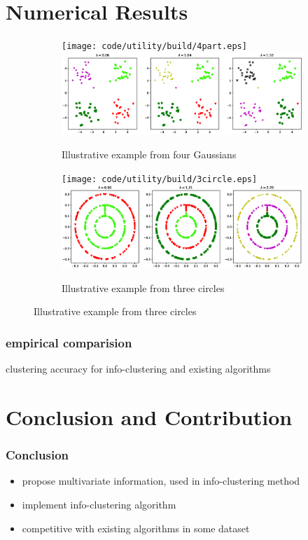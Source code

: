 \documentclass{beamer}
\begin{document}
\section{Numerical Results}
\begin{frame}
\begin{figure}[!ht]
\centering
\begin{subfigure}{\textwidth}
{\texttt{[image: code/utility/build/4part.eps]}}
{\includegraphics[width=12cm]{pic/4part.eps}} %

\caption{Illustrative example from four Gaussians}\label{fig:4p}
\end{subfigure}
\begin{subfigure}{\textwidth}
{\texttt{[image: code/utility/build/3circle.eps]}}
{\includegraphics[width=12cm]{pic/3circle.eps}} %
\caption{Illustrative example from three circles}\label{fig:3c}
\end{subfigure}
\end{figure}
\end{frame}
\begin{frame}
\frametitle{empirical comparision}
\begin{table}[!ht]
\centering
{}
\caption{clustering accuracy for info-clustering and existing algorithms}
\end{table}
\end{frame}
\section{Conclusion and Contribution}
\begin{frame}
\frametitle{Conclusion}
\begin{itemize}
\item propose multivariate information, used in info-clustering method
\item implement info-clustering algorithm
\item competitive with existing algorithms in some dataset
\end{itemize}
\end{frame}
\end{document}
